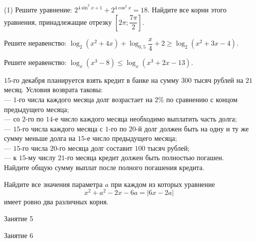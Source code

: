 \begin{homework}[number=2]
\begin{listofex}
		\item \begin{tasks}(1)
			\task Решите уравнение: \( 2^{4\sin^2x+1}+2^{4\cos^2x}=18 \).
			\task Найдите все корни этого уравнения, принадлежащие отрезку \( \left[ 2\pi; \dfrac{7\pi}{2} \right] \).
		\end{tasks}
		\item Решите неравенство: \( \log_2(x^2+4x)+\log_{0,5}\dfrac{x}{4}+2\ge\log_2(x^2+3x-4)\).
		\item Решите неравенство: \( \log_x(x^3-8)\le\log_x(x^3+2x-13) \).
		\item \( 15 \)-го декабря планируется взять кредит в банке на сумму \( 300 \) тысяч рублей на \( 21 \) месяц. Условия возврата таковы:\\		
		--- \( 1 \)-го числа каждого месяца долг возрастает на \( 2\% \) по сравнению с концом предыдущего месяца;\\
		--- со \( 2 \)-го по \( 14 \)-е число каждого месяца необходимо выплатить часть долга;\\
		--- \( 15 \)-го числа каждого месяца с \( 1 \)-го по \( 20 \)-й долг должен быть на одну и ту же сумму меньше долга на \( 15 \)-е число предыдущего месяца;\\		
		--- \( 15 \)-го числа \( 20 \)-го месяца долг составит \( 100 \) тысяч рублей;\\
		--- к \( 15 \)-му числу \( 21 \)-го месяца кредит должен быть полностью погашен.\\
		Найдите общую сумму выплат после полного погашения кредита.
		\item Найдите все значения параметра \( a \) при каждом из которых уравнение
		\[x^2+a^2-2x-6a=|6x-2a|\]
		имеет ровно два различных корня.
	\end{listofex}
\end{homework}

\begin{class}[number=5]
	\begin{listofex}
		\item Занятие 5
	\end{listofex}
\end{class}

\begin{class}[number=6]
	\begin{listofex}
		\item Занятие 6
	\end{listofex}
\end{class}


